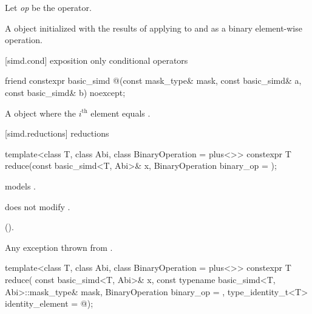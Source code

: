 \begin{itemdescr}
  \pnum Let \textit{op} be the operator.

  \pnum\ConstraintOperatorTWellFormed

  \pnum\returns
  A  object initialized with the results of applying \op{} to  and
   as a binary element-wise operation.
\end{itemdescr}

[simd.cond]{ exposition only conditional operators}

\begin{itemdecl}
friend constexpr basic_simd
@\simdselect@(const mask_type& mask, const basic_simd& a, const basic_simd& b) noexcept;
\end{itemdecl}

\begin{itemdescr}
  \pnum\returns
  A  object where the $i^\text{th}$ element equals  \foralli.
\end{itemdescr}

[simd.reductions]{ reductions}

\begin{itemdecl}
template<class T, class Abi, class BinaryOperation = plus<>>
  constexpr T reduce(const basic_simd<T, Abi>& x, BinaryOperation binary_op = {});
\end{itemdecl}

\begin{itemdescr}
  \pnum\constraints
   models .

  \pnum\expects
   does not modify .

  \pnum\returns
  ().

  \pnum\throws
  Any exception thrown from .
\end{itemdescr}

\begin{itemdecl}
template<class T, class Abi, class BinaryOperation = plus<>>
  constexpr T reduce(
    const basic_simd<T, Abi>& x, const typename basic_simd<T, Abi>::mask_type& mask,
    BinaryOperation binary_op = {}, type_identity_t<T> identity_element = @\seebelow@);
\end{itemdecl}

